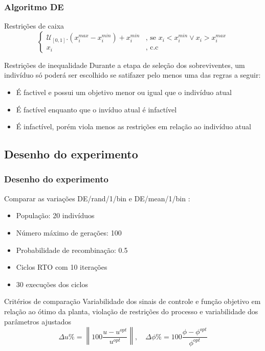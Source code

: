 \documentclass{beamer}
\begin{document}
\begin{frame}
\frametitle{Algoritmo DE}

\begin{small}
	\begin{block}{Restrições de caixa}
	\begin{equation}
		\begin{cases}
			\mathcal{U}_{[0,1]}.(x_i^{max} - x_i^{min}) +x_i^{min}  & \text{, se } x_i < x_i^{min} \vee x_i >  x_i^{max} \\
			x_i & \text{, c.c }
		\end{cases}
	\end{equation}
	\end{block}
\end{small}
\begin{small}
	\begin{block}{Restrições de inequalidade}
		Durante a etapa de seleção dos sobreviventes, um indivíduo só poderá ser escolhido se satifazer pelo menos uma das regras a seguir:
		\begin{itemize}
			\item É factivel e possui um objetivo menor ou igual que o indivíduo atual
			\item É factível enquanto que o invíduo atual é infactível
			\item É infactível, porém viola menos as restrições em relação ao indivíduo atual
		\end{itemize}
		
	\end{block}	
\end{small}

\end{frame}

\subsection{Desenho do experimento}

\begin{frame}
	\frametitle{Desenho do experimento}
	Comparar as variações DE/rand/1/bin e DE/mean/1/bin :
	\begin{itemize}
		\item População: 20 indivíduos
		\item Número máximo de gerações: 100
		\item Probabilidade de recombinação: 0.5
		\item Ciclos RTO com 10 iterações
		\item 30 execuções dos ciclos
	\end{itemize}
	\begin{block}{Critérios de comparação}
		Variabilidade dos sinais de controle e função objetivo em relação ao ótimo da planta, violação de restrições do processo e variabilidade dos parâmetros ajustados
		\begin{equation}
			\label{eq:du_perc}
			\Delta u\% =  \left\|100 \frac{u - u^{opt}}{u^{opt}} \right\|, \quad \Delta \phi \% =  100 \frac{\phi - \phi^{opt}}{\phi^{opt}} 
		\end{equation}
	\end{block}
	
\end{frame}	
\end{document}
